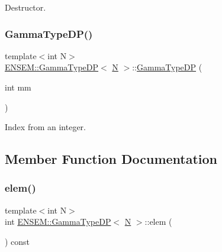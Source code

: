 Destructor. 

\mbox{\label{classENSEM_1_1GammaTypeDP_a6a31946a6e7bde24f7bae87f6cfd2add}} 
\subsubsection{\texorpdfstring{GammaTypeDP()}{GammaTypeDP()}\hspace{0.1cm}{\footnotesize\ttfamily [6/6]}}
{\footnotesize\ttfamily template$<$int N$>$ \\
\mbox{\hyperlink{classENSEM_1_1GammaTypeDP}{E\+N\+S\+E\+M\+::\+Gamma\+Type\+DP}}$<$ \mbox{\hyperlink{adat__devel_2lib_2hadron_2operator__name__util_8cc_a7722c8ecbb62d99aee7ce68b1752f337}{N}} $>$\+::\mbox{\hyperlink{classENSEM_1_1GammaTypeDP}{Gamma\+Type\+DP}} (\begin{DoxyParamCaption}\item[{int}]{mm }\end{DoxyParamCaption})\hspace{0.3cm}{\ttfamily [inline]}}



Index from an integer. 



\subsection{Member Function Documentation}
\mbox{\label{classENSEM_1_1GammaTypeDP_a0d7ad0581feda4578c3ee7631ce730e2}} 
\subsubsection{\texorpdfstring{elem()}{elem()}\hspace{0.1cm}{\footnotesize\ttfamily [1/3]}}
{\footnotesize\ttfamily template$<$int N$>$ \\
int \mbox{\hyperlink{classENSEM_1_1GammaTypeDP}{E\+N\+S\+E\+M\+::\+Gamma\+Type\+DP}}$<$ \mbox{\hyperlink{adat__devel_2lib_2hadron_2operator__name__util_8cc_a7722c8ecbb62d99aee7ce68b1752f337}{N}} $>$\+::elem (\begin{DoxyParamCaption}{ }\end{DoxyParamCaption}) const\hspace{0.3cm}{\ttfamily [inline]}}



